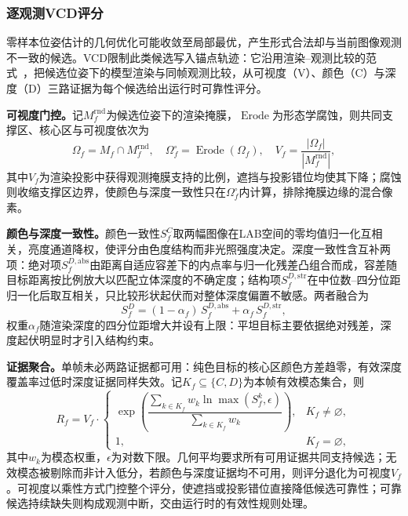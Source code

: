 \documentclass[review]{vgtc}
\begin{document}
\subsubsection{逐观测VCD评分}

零样本位姿估计的几何优化可能收敛至局部最优，产生形式合法却与当前图像观测不一致的候选。VCD限制此类候选写入锚点轨迹：它沿用渲染--观测比较的范式~\cite{deepim2018,latentfusion2020,focalpose2022}，把候选位姿下的模型渲染与同帧观测比较，从可视度（V）、颜色（C）与深度（D）三路证据为每个候选给出运行时可靠性评分。

\textbf{可视度门控。}记$M_f^{\mathrm{rnd}}$为候选位姿下的渲染掩膜，$\operatorname{Erode}$为形态学腐蚀，则共同支撑区、核心区与可视度依次为
\begin{equation}
\Omega_f = M_f \cap M_f^{\mathrm{rnd}}, \quad \Omega_f^{\circ} = \operatorname{Erode}(\Omega_f), \quad V_f = \frac{|\Omega_f|}{|M_f^{\mathrm{rnd}}|},
\label{eq:visibility}
\end{equation}
其中$V_f$为渲染投影中获得观测掩膜支持的比例，遮挡与投影错位均使其下降；腐蚀则收缩支撑区边界，使颜色与深度一致性只在$\Omega_f^{\circ}$内计算，排除掩膜边缘的混合像素。

\textbf{颜色与深度一致性。}颜色一致性$S_f^C$取两幅图像在LAB空间的零均值归一化互相关，亮度通道降权，使评分由色度结构而非光照强度决定。深度一致性含互补两项：绝对项$S_f^{D,\mathrm{abs}}$由距离自适应容差下的内点率与归一化残差凸组合而成，容差随目标距离按比例放大以匹配立体深度的不确定度；结构项$S_f^{D,\mathrm{str}}$在中位数--四分位距归一化后取互相关，只比较形状起伏而对整体深度偏置不敏感。两者融合为
\begin{equation}
S_f^D = (1-\alpha_f)\,S_f^{D,\mathrm{abs}} + \alpha_f\,S_f^{D,\mathrm{str}},
\label{eq:depth-score}
\end{equation}
权重$\alpha_f$随渲染深度的四分位距增大并设有上限：平坦目标主要依据绝对残差，深度起伏明显时才引入结构约束。

\textbf{证据聚合。}单帧未必两路证据都可用：纯色目标的核心区颜色方差趋零，有效深度覆盖率过低时深度证据同样失效。记$K_f \subseteq \{C, D\}$为本帧有效模态集合，则
\begin{equation}
R_f = V_f \cdot
\begin{cases}
\exp\!\left(\dfrac{\sum_{k \in K_f} w_k \ln \max(S_f^{k}, \epsilon)}{\sum_{k \in K_f} w_k}\right), & K_f \neq \varnothing, \\[6pt]
1, & K_f = \varnothing,
\end{cases}
\label{eq:vcd}
\end{equation}
其中$w_k$为模态权重，$\epsilon$为对数下限。几何平均要求所有可用证据共同支持候选；无效模态被剔除而非计入低分，若颜色与深度证据均不可用，则评分退化为可视度$V_f$。可视度以乘性方式门控整个评分，使遮挡或投影错位直接降低候选可靠性；可靠候选持续缺失则构成观测中断，交由运行时的有效性规则处理。
\end{document}
